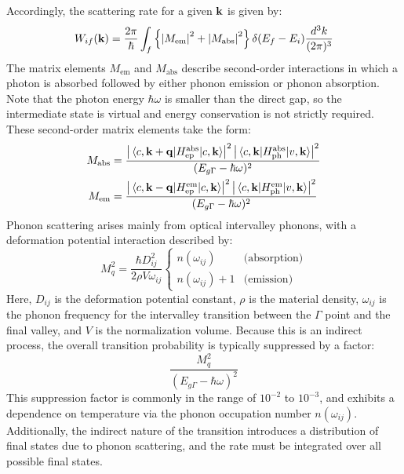 Accordingly, the scattering rate for a given \( \vb{k} \) is given by:
\begin{equation}
	W_{if}(\vb{k}) = \frac{2\pi}{\hbar} \int_f \left\{ \abs{M_{\text{em}}}^2 + \abs{M_{\text{abs}}}^2 \right\} \delta(E_f - E_i) \frac{d^3k}{(2\pi)^3}
\end{equation}
The matrix elements \( M_{\text{em}} \) and \( M_{\text{abs}} \) describe second-order interactions in which a photon is absorbed followed by either phonon emission or phonon absorption. Note that the photon energy \( \hbar \omega \) is smaller than the direct gap, so the intermediate state is virtual and energy conservation is not strictly required.\\
These second-order matrix elements take the form:
\begin{equation}
	\begin{aligned}
		M_{\text{abs}} & = \frac{ \left| \mel{c, \vb{k} + \vb{q}}{H_{\text{ep}}^{\text{abs}}}{c, \vb{k}} \right|^2 \left| \mel{c, \vb{k}}{H_{\text{ph}}^{\text{abs}}}{v, \vb{k}} \right|^2 }{(E_{g\Gamma} - \hbar \omega)^2} \\
		M_{\text{em}}  & = \frac{ \left| \mel{c, \vb{k} - \vb{q}}{H_{\text{ep}}^{\text{em}}}{c, \vb{k}} \right|^2 \left| \mel{c, \vb{k}}{H_{\text{ph}}^{\text{em}}}{v, \vb{k}} \right|^2 }{(E_{g\Gamma} - \hbar \omega)^2}
	\end{aligned}
\end{equation}
Phonon scattering arises mainly from optical intervalley phonons, with a deformation potential interaction described by:\\
\begin{equation}
	M_q^2 = \frac{\hbar D_{ij}^2}{2 \rho V \omega_{ij}} \left\{
	\begin{array}{ll}
		n(\omega_{ij})     & \text{(absorption)} \\
		n(\omega_{ij}) + 1 & \text{(emission)}
	\end{array}
	\right.
\end{equation}
Here, \( D_{ij} \) is the deformation potential constant, \( \rho \) is the material density, \( \omega_{ij} \) is the phonon frequency for the intervalley transition between the \(\Gamma\) point and the final valley, and \( V \) is the normalization volume. Because this is an indirect process, the overall transition probability is typically suppressed by a factor:
\begin{equation}
	\frac{M_q^2}{(E_{g\Gamma} - \hbar \omega)^2}
\end{equation}
This suppression factor is commonly in the range of \( 10^{-2} \) to \( 10^{-3} \), and exhibits a dependence on temperature via the phonon occupation number \( n(\omega_{ij}) \). Additionally, the indirect nature of the transition introduces a distribution of final states due to phonon scattering, and the rate must be integrated over all possible final states.\\
